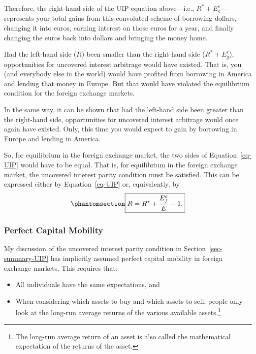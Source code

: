 \documentclass[
  letterpaper,
]{book}
\providecommand{\tightlist}{%
  \setlength{\itemsep}{0pt}\setlength{\parskip}{0pt}}\usepackage{longtable,booktabs,array}
\theoremstyle{plain}
\theoremstyle{remark}
\begin{document}
Therefore, the right-hand side of the UIP equation above---i.e.,
\(R^* + E^e_g\)---represents your total gains from this convoluted
scheme of borrowing dollars, changing it into euros, earning interest on
those euros for a year, and finally changing the euros back into dollars
and bringing the money home.

Had the left-hand side (\(R\)) been smaller than the right-hand side
(\(R^* + E^e_g\)), opportunities for uncovered interest arbitrage would
have existed. That is, you (and everybody else in the world) would have
profited from borrowing in America and lending that money in Europe. But
that would have violated the equilibrium condition for the foreign
exchange markets.

In the same way, it can be shown that had the left-hand side been
greater than the right-hand side, opportunities for uncovered interest
arbitrage would once again have existed. Only, this time you would
expect to gain by borrowing in Europe and lending in America.

So, for equilibrium in the foreign exchange market, the two sides of
Equation~\ref{eq-UIP} would have to be equal. That is, for equilibrium
in the foreign exchange market, the uncovered interest parity condition
must be satisfied. This can be expressed either by Equation~\ref{eq-UIP}
or, equivalently, by \begin{equation}\phantomsection\label{eq-UIP-alt}{
\fbox{$\displaystyle R=R^*+\frac{E^e_f}{E}-1.$}
}\end{equation}

\subsubsection{Perfect Capital Mobility}\label{sec-pcm}

My discussion of the uncovered interest parity condition in
Section~\ref{sec-summary-UIP} has implicitly assumed perfect capital
mobility in foreign exchange markets.
This requires that:

\begin{itemize}
\tightlist
\item
  All individuals have the same expectations, and
\item
  When considering which assets to buy and which assets to sell, people
  only look at the long-run average returns of the various available
  assets.\footnote{The long-run average return of an asset is also
    called the mathematical expectation
    of the returns of the asset.}
\end{itemize}
\end{document}
